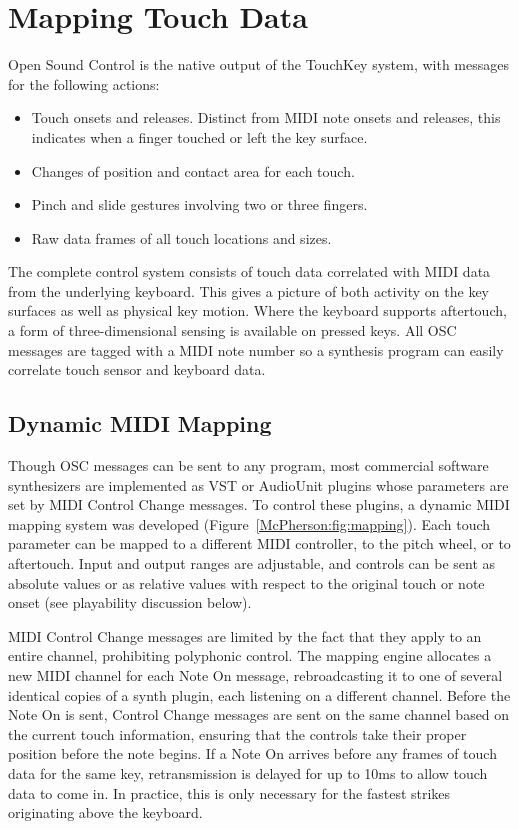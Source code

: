 \section{Mapping Touch Data}
Open Sound Control is the native output of the TouchKey system, with messages for the following actions:
\begin{itemize}
\item{Touch onsets and releases. Distinct from MIDI note onsets and releases, this indicates when a finger touched or left the key surface.}
\item{Changes of position and contact area for each touch.}
\item{Pinch and slide gestures involving two or three fingers.}
\item{Raw data frames of all touch locations and sizes.}
\end{itemize}

The complete control system consists of touch data correlated with MIDI data from the underlying keyboard. This gives a picture of both activity on the key surfaces as well as physical key motion. Where the keyboard supports aftertouch, a form of three-dimensional sensing is available on pressed keys. All OSC messages are tagged with a MIDI note number so a synthesis program can easily correlate touch sensor and keyboard data.

\subsection{Dynamic MIDI Mapping}
Though OSC messages can be sent to any program, most commercial software synthesizers are implemented as VST or AudioUnit plugins whose parameters are set by MIDI Control Change messages. To control these plugins, a dynamic MIDI mapping system was developed (Figure~\ref{McPherson:fig:mapping}). Each touch parameter can be mapped to a different MIDI controller, to the pitch wheel, or to aftertouch. Input and output ranges are adjustable, and controls can be sent as absolute values or as relative values with respect to the original touch or note onset (see playability discussion below).

MIDI Control Change messages are limited by the fact that they apply to an entire channel, prohibiting polyphonic control. The mapping engine allocates a new MIDI channel for each Note On message, rebroadcasting it to one of several identical copies of a synth plugin, each listening on a different channel. Before the Note On is sent, Control Change messages are sent on the same channel based on the current touch information, ensuring that the controls take their proper position before the note begins. If a Note On arrives before any frames of touch data for the same key, retransmission is delayed for up to 10ms to allow touch data to come in. In practice, this is only necessary for the fastest strikes originating above the keyboard.

